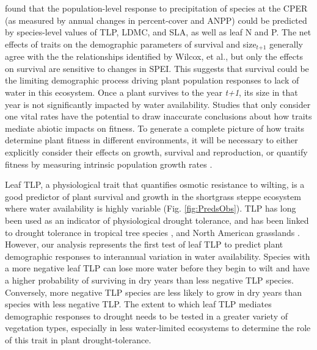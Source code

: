 \documentclass[12pt, letterpaper]{article}
\begin{document}
\cite{Wilcox2020PlantPrairie} found that the population-level response to precipitation of species at the CPER (as measured by annual changes in percent-cover and ANPP) could be predicted by species-level values of TLP, LDMC, and SLA, as well as leaf N and P. The net effects of traits on the demographic parameters of survival and size$_\textit{t+1}$ generally agree with the the relationships identified by Wilcox, et al., but only the effects on survival are sensitive to changes in SPEI. This suggests that survival could be the limiting demographic process driving plant population responses to lack of water in this ecosystem. Once a plant survives to the year \textit{t+1}, its size in that year is not significantly impacted by water availability. Studies that only consider one vital rates have the potential to draw inaccurate conclusions about how traits mediate abiotic impacts on fitness. To generate a complete picture of how traits determine plant fitness in different environments, it will be necessary to either explicitly consider their effects on growth, survival and reproduction, or quantify fitness by measuring intrinsic population growth rates \citep{Laughlin2020TheFitness}.  

 Leaf TLP, a physiological trait that quantifies osmotic resistance to wilting, is a good predictor of plant survival and growth in the shortgrass steppe ecosystem where water availability is highly variable (Fig. \ref{fig:PredsObs}). TLP has long been used as an indicator of physiological drought tolerance, and has been linked to drought tolerance in tropical tree species \citep{Bartlett2012}, and North American grasslands \citep{Griffin-Nolan2019, Blumenthal2020, Wilcox2020PlantPrairie}. However, our analysis represents the first test of leaf TLP to predict plant demographic responses to interannual variation in water availability. Species with a more negative leaf TLP can lose more water before they begin to wilt and have a higher probability  of surviving in dry years than less negative TLP species. Conversely, more negative TLP species are less likely to grow in dry years than species with less negative TLP. The extent to which leaf TLP mediates demographic responses to drought needs to be tested in a greater variety of vegetation types, especially in less water-limited ecosystems to determine the role of this trait in plant drought-tolerance.   
\end{document}
